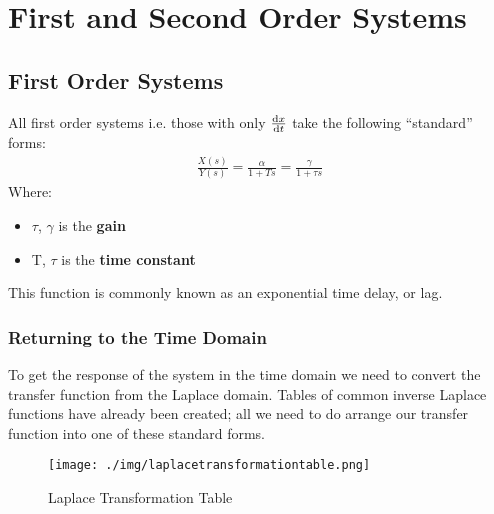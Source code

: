 \chapter{First and Second Order Systems}
\section{First Order Systems}
All first order systems i.e. those with only $\frac{\dif x}{\dif t}$ take the following “standard” forms:
\begin{gather}
  \frac{X(s)}{Y(s)} = \frac{\alpha}{1+Ts} = \frac{\gamma}{1+\tau s}
\end{gather}
Where:
\begin{itemize}
  \item $\tau$, $\gamma$ is the \textbf{gain}
  \item T, $\tau$ is the \textbf{time constant}
\end{itemize}
This function is commonly known as an exponential time delay, or lag.
\subsection{Returning to the Time Domain}
To get the response of the system in the time domain we need to convert the transfer function from the Laplace domain. Tables of common inverse Laplace functions have already been created; all we need to do arrange our transfer function into one of these standard forms.
\begin{figure}[H]
  \centering
  \texttt{[image: ./img/laplacetransformationtable.png]}
  \caption{Laplace Transformation Table}
\end{figure}
